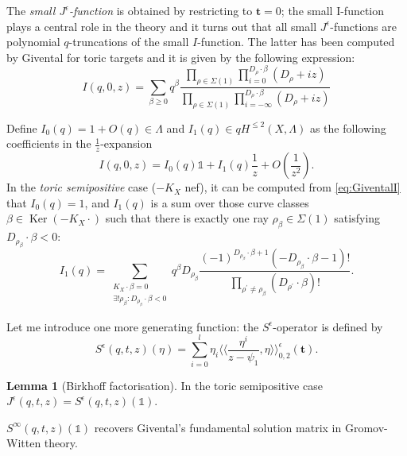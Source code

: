 \documentclass[11pt]{amsart}
\newcommand{\lala}{\langle\!\langle}
\newcommand{\rara}{\rangle\!\rangle}
\theoremstyle{definition}
\newtheorem{lem}[thm]{Lemma}
\theoremstyle{definition}
\newcommand{\ilemph}[1]{\emph{#1}}
\begin{document}
The \ilemph{small $J^\epsilon$-function} is obtained by restricting to $\mathbf t=0$; the small I-function plays a central role in the theory and it turns out that all small $J^\epsilon$-functions are polynomial $q$-truncations of the small $I$-function.
The latter has been computed by Givental for toric targets and it is given by the following expression:
\begin{equation}\label{eq:GiventalI} I(q,0,z)=\sum_{\beta\geq 0}q^\beta \frac{\prod_{\rho\in\Sigma(1)}\prod_{i=0}^{D_\rho\cdot\beta}(D_\rho+iz)}{\prod_{\rho\in\Sigma(1)}\prod_{i=-\infty}^{D_\rho\cdot\beta}(D_\rho+iz)}\end{equation}

Define $I_0(q)= 1+O(q)\in \Lambda$ and $I_1(q)\in qH^{\leq 2}(X,\Lambda)$ as the following coefficients in the $\frac{1}{z}$-expansion
\[I(q,0,z)=I_0(q)\mathds{1}+I_1(q)\frac{1}{z}+O(\frac{1}{z^2}).\]
In the \ilemph{toric semipositive} case ($-K_X$ nef), it can be computed from \eqref{eq:GiventalI} that $I_0(q)=1$, and $I_1(q)$ is a sum over those curve classes $\beta\in \operatorname{Ker}(-K_X\cdot )$ such that there is exactly one ray $\rho_\beta\in\Sigma(1)$ satisfying $D_{\rho_\beta}\cdot\beta <0$:
\[I_1(q)=\sum_{\substack{K_X\cdot\beta=0 \\ \exists!\rho_\beta:D_{\rho_\beta}\cdot\beta<0}}q^\beta D_{\rho_\beta}\frac{(-1)^{D_{\rho_\beta}\cdot\beta+1}(-D_{\rho_\beta}\cdot\beta-1)!}{\prod_{\rho^\prime\neq\rho_\beta}(D_{\rho^\prime}\cdot\beta)!}.\]

Let me introduce one more generating function: the $S^\epsilon$-operator is defined by
\[S^\epsilon(q,t,z)(\eta)=\sum_{i=0}^l \eta_i \lala \frac{\eta^i}{z-\psi_1},\eta\rara^\epsilon_{0,2}(\mathbf{t}).\]

\begin{lem}[Birkhoff factorisation] \cite[Theorem 1.3.1]{CF-K-wallcrossing} In the toric semipositive case $J^\epsilon(q,t,z)=S^\epsilon(q,t,z)(\mathds{1})$. \end{lem}

$S^\infty(q,t,z)(\mathds{1})$ recovers Givental's fundamental solution matrix in Gromov-Witten theory.
\end{document}
